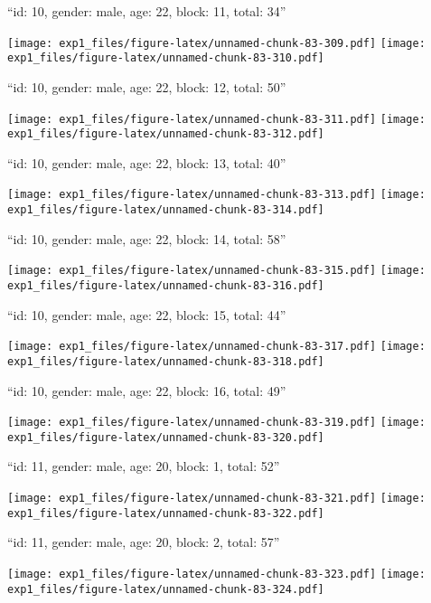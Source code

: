 \documentclass[11pt,,]{article}
\begin{document}
\newpage
[1] 

``id: 10, gender: male, age: 22, block: 11, total: 34''

\texttt{[image: exp1\_files/figure-latex/unnamed-chunk-83-309.pdf]}
\texttt{[image: exp1\_files/figure-latex/unnamed-chunk-83-310.pdf]}

\newpage
[1] 

``id: 10, gender: male, age: 22, block: 12, total: 50''

\texttt{[image: exp1\_files/figure-latex/unnamed-chunk-83-311.pdf]}
\texttt{[image: exp1\_files/figure-latex/unnamed-chunk-83-312.pdf]}

\newpage
[1] 

``id: 10, gender: male, age: 22, block: 13, total: 40''

\texttt{[image: exp1\_files/figure-latex/unnamed-chunk-83-313.pdf]}
\texttt{[image: exp1\_files/figure-latex/unnamed-chunk-83-314.pdf]}

\newpage
[1] 

``id: 10, gender: male, age: 22, block: 14, total: 58''

\texttt{[image: exp1\_files/figure-latex/unnamed-chunk-83-315.pdf]}
\texttt{[image: exp1\_files/figure-latex/unnamed-chunk-83-316.pdf]}

\newpage
[1] 

``id: 10, gender: male, age: 22, block: 15, total: 44''

\texttt{[image: exp1\_files/figure-latex/unnamed-chunk-83-317.pdf]}
\texttt{[image: exp1\_files/figure-latex/unnamed-chunk-83-318.pdf]}

\newpage
[1] 

``id: 10, gender: male, age: 22, block: 16, total: 49''

\texttt{[image: exp1\_files/figure-latex/unnamed-chunk-83-319.pdf]}
\texttt{[image: exp1\_files/figure-latex/unnamed-chunk-83-320.pdf]}

\newpage
[1] 

``id: 11, gender: male, age: 20, block: 1, total: 52''

\texttt{[image: exp1\_files/figure-latex/unnamed-chunk-83-321.pdf]}
\texttt{[image: exp1\_files/figure-latex/unnamed-chunk-83-322.pdf]}

\newpage
[1] 

``id: 11, gender: male, age: 20, block: 2, total: 57''

\texttt{[image: exp1\_files/figure-latex/unnamed-chunk-83-323.pdf]}
\texttt{[image: exp1\_files/figure-latex/unnamed-chunk-83-324.pdf]}
\end{document}
